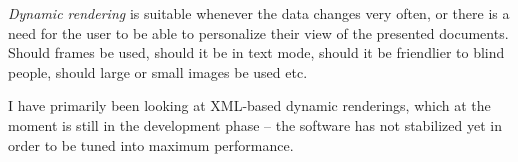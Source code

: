 \textit{Dynamic rendering} is suitable whenever the data changes very
often, or there is a need  for the user to be able to personalize
their view of the presented documents.   Should frames be used, should
it be in text mode, should it be friendlier to blind people, should
large or small images be used etc.

I have primarily been looking at XML-based dynamic renderings, which
at the moment is still in the development phase -- the software has
not stabilized yet in order to be tuned into maximum performance.   




